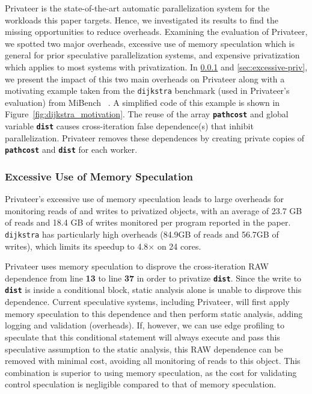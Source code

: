 Privateer is the state-of-the-art automatic parallelization system for the
workloads this paper targets. Hence, we investigated its results to find
the missing opportunities to reduce overheads.
%
Examining the evaluation of Privateer, we spotted two major overheads,
excessive use of memory speculation which is general for prior speculative
parallelization systems, and expensive privatization which applies to
most systems with privatization.
%
In \ref{sec:excessive-memory-spec} and \ref{sec:excessive-priv}, we present
the impact of this two main overheads on Privateer along with a motivating
example taken from the \texttt{dijkstra} benchmark (used in Privateer's
evaluation) from MiBench ~\cite{guthaus:2001:iiwsc}. A simplified code of this example is
shown in Figure~\ref{fig:dijkstra_motivation}. The reuse of the array
\texttt{\textbf{pathcost}} and global variable \texttt{\textbf{dist}}
causes cross-iteration false dependence(s) that inhibit parallelization.
Privateer removes these dependences by creating private copies of
\texttt{\textbf{pathcost}} and \texttt{\textbf{dist}} for each worker.

\subsubsection{Excessive Use of Memory Speculation}
\label{sec:excessive-memory-spec}

Privateer's excessive use of memory speculation leads to large overheads
for monitoring reads of and writes to privatized objects, with an average
of 23.7 GB of reads and 18.4 GB of writes monitored per program reported in
the paper. \texttt{dijkstra} has particularly high overheads (84.9GB of
reads and 56.7GB of writes), which limits its speedup to 4.8$\times$ on 24
cores.


Privateer uses memory speculation to disprove the cross-iteration
RAW dependence from line \textbf{13} to line \textbf{37} in order to
privatize \texttt{\textbf{dist}}. Since the write to \texttt{\textbf{dist}}
is inside a conditional block, static analysis alone is unable to disprove
this dependence. Current speculative systems, including Privateer, will
first apply memory speculation to this dependence and then perform static
analysis, adding logging and validation (overheads). If, however, we can
use edge profiling to speculate that this conditional statement will always
execute and pass this speculative assumption to the static analysis, this
RAW dependence can be removed with minimal cost, avoiding all monitoring of
reads to this object. This combination is superior to using memory
speculation, as the cost for validating control speculation is negligible
compared to that of memory speculation.

